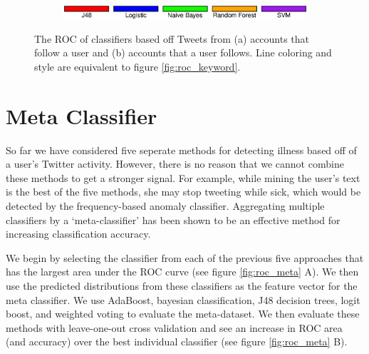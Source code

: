 \documentclass{acm_proc_article-sp}
\begin{document}
\begin{figure} [h]
\begin{subfigure}[b]{.2\textwidth}
\end{subfigure}
\begin{subfigure}[b]{.45\textwidth}
\includegraphics[width=\textwidth]{figs/keyword_legend.eps}
\end{subfigure}
\caption{The ROC of classifiers based off Tweets from (a) accounts that follow a user and (b) accounts that a user follows. Line coloring and style are equivalent to figure \ref{fig:roc_keyword}.}
\label{fig:roc_network}
\end{figure}

\section{Meta Classifier}

So far we have considered five seperate methods for detecting illness based off of a user's Twitter activity. However, there is no reason that we cannot combine these methods to get a stronger signal. For example, while mining the user's text is the best of the five methods, she may stop tweeting while sick, which would be detected by the frequency-based anomaly classifier. Aggregating multiple classifiers by a `meta-classifier' has been shown to be an effective method for increasing classification accuracy. \cite{Frossyniotis:2004wx,Todorovski:2003hk}


We begin by selecting the classifier from each of the previous five approaches that has the largest area under the ROC curve (see figure \ref{fig:roc_meta} A). We then use the predicted distributions from these classifiers as the feature vector for the meta classifier. We use AdaBoost, bayesian classification, J48 decision trees, logit boost, and weighted voting to evaluate the meta-dataset. We then evaluate these methods with leave-one-out cross validation and see an increase in ROC area (and accuracy) over the best individual classifier (see figure \ref{fig:roc_meta} B).

\end{document}
